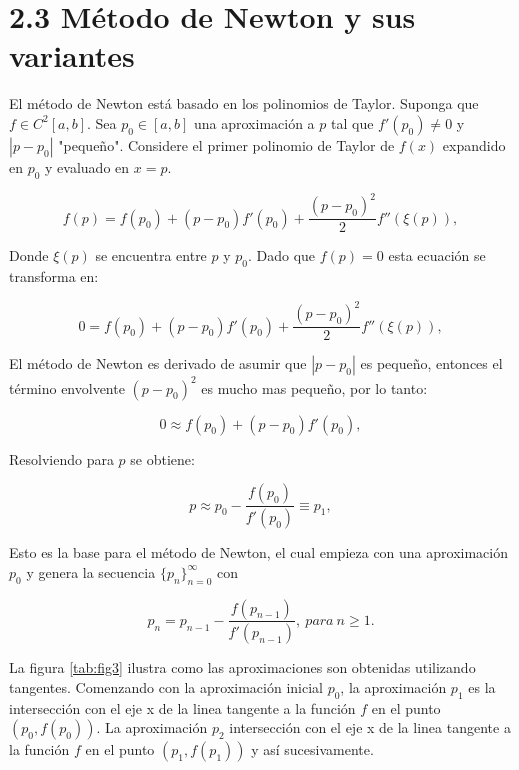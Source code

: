 \section*{2.3 Método de Newton y sus variantes}

El método de Newton está basado en los polinomios de Taylor.
Suponga que $f\in C^2[a,b]$. Sea $p_0\in [a,b]$ una aproximación a $p$ tal que $f'(p_0)\neq0$ y $|p-p_0|$ "pequeño". Considere el primer polinomio de Taylor de $f(x)$ expandido en $p_0$ y evaluado en $x=p$.

\begin{equation*}
    f(p)=f(p_0)+(p-p_0)f'(p_0)+\frac{(p-p_0)^2}{2}f''(\xi(p)),
\end{equation*}

Donde $\xi(p)$ se encuentra entre $p$ y $p_0$. Dado que $f(p)=0$ esta ecuación se transforma en:

\begin{equation*}
    0=f(p_0)+(p-p_0)f'(p_0)+\frac{(p-p_0)^2}{2}f''(\xi(p)),
\end{equation*}

El método de Newton es derivado de asumir que $|p-p_0|$ es pequeño, entonces el término envolvente $(p-p_0)^2$ es mucho mas pequeño, por lo tanto: 

\begin{equation*}
    0\approx f(p_0)+(p-p_0)f'(p_0),
\end{equation*}

Resolviendo para $p$ se obtiene: 

\begin{equation*}
    p\approx p_0 -\frac{f(p_0)}{f'(p_0)}\equiv p_1,
\end{equation*}

Esto es la base para el método de Newton, el cual empieza con una aproximación $p_0$ y genera la secuencia $\{p_n\}_{n=0}^{\infty}$ con

\begin{equation*}
    p_n= p_{n-1} -\frac{f(p_{n-1})}{f'(p_{n-1})}, \ para \ n\geq 1.
\end{equation*}

La figura \ref{tab:fig3} ilustra como las aproximaciones son obtenidas utilizando tangentes. Comenzando con la aproximación inicial $p_0$, la aproximación $p_1$ es la intersección con el eje x de la linea tangente a la función $f$ en el punto $(p_0,f(p_0))$. La aproximación $p_2$ intersección con el eje x de la linea tangente a la función $f$ en el punto $(p_1,f(p_1))$ y así sucesivamente.

